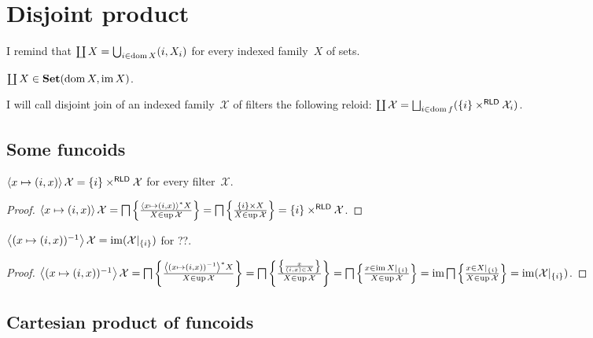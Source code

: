 \chapter{Disjoint product}

I remind that
$\coprod X = \bigcup_{i\in\operatorname{dom} X} (i,X_i)$
for every indexed family~$X$ of sets.

\begin{obvious}
$\coprod X\in\mathbf{Set}(\operatorname{dom} X,\operatorname{im} X)$.
\end{obvious}

\begin{defn}
I will call disjoint join of an indexed family~$\mathcal{X}$ of filters the following reloid: $\coprod\mathcal{X} = \bigsqcup_{i\in\dom f}(\{i\}\times^{\mathsf{RLD}}\mathcal{X}_i)$.
\end{defn}

\section{Some funcoids}

\begin{prop}
$\left\langle x\mapsto(i,x)\right\rangle\mathcal{X}=\{i\}\times^{\mathsf{RLD}}\mathcal{X}$ for every filter~$\mathcal{X}$.
\end{prop}

\begin{proof}
$\left\langle x\mapsto(i,x)\right\rangle\mathcal{X}=\bigsqcap\left\{ \frac{\left\langle x\mapsto(i,x)\right\rangle ^{\ast}X}{X\in\operatorname{up}\mathcal{X}}\right\}=\bigsqcap\left\{ \frac{\{i\}\times X}{X\in\operatorname{up}\mathcal{X}}\right\}=\{i\}\times^{\mathsf{RLD}}\mathcal{X}$.
\end{proof}

\begin{prop}
$\left\langle (x\mapsto(i,x))^{-1}\right\rangle\mathcal{X}=\operatorname{im}(\mathcal{X}|_{\{i\}})$ for ??.
\end{prop}

\begin{proof}
$\left\langle (x\mapsto(i,x))^{-1}\right\rangle\mathcal{X}=\bigsqcap\left\{ \frac{\left\langle (x\mapsto(i,x))^{-1}\right\rangle ^{\ast}X}{X\in\operatorname{up}\mathcal{X}}\right\}=\bigsqcap\left\{ \frac{\left\{ \frac{x}{(i,x)\in X}\right\}}{X\in\operatorname{up}\mathcal{X}}\right\}=\bigsqcap\left\{ \frac{x\in\operatorname{im} X|_{\{i\}}}{X\in\operatorname{up}\mathcal{X}}\right\}=\operatorname{im}\bigsqcap\left\{ \frac{x\in X|_{\{i\}}}{X\in\operatorname{up}\mathcal{X}}\right\}=\operatorname{im}(\mathcal{X}|_{\{i\}})$.
\end{proof}

\section{Cartesian product of funcoids}

